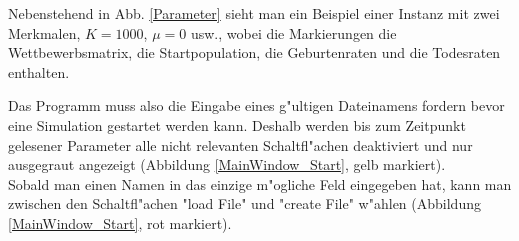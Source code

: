 \documentclass[11pt, a4paper, german]{article}
\theoremstyle{plain}
\begin{document}
\begin{center}
\begin{minipage}{0.6\textwidth}
		Nebenstehend in Abb. \ref{Parameter} sieht man ein Beispiel einer Instanz mit zwei Merkmalen, $ K = 1000 $, $ \mu = 0 $ usw., wobei die Markierungen die Wettbewerbsmatrix, die Startpopulation, die Geburtenraten und die Todesraten enthalten.\\
	\end{minipage}
	\end{center}
	
	Das Programm muss also die Eingabe eines g"ultigen Dateinamens fordern bevor eine Simulation gestartet werden kann. Deshalb werden bis zum Zeitpunkt gelesener Parameter alle nicht relevanten Schaltfl"achen deaktiviert und nur ausgegraut angezeigt (Abbildung \ref{MainWindow_Start}, gelb markiert).\\
	Sobald man einen Namen in das einzige m"ogliche Feld eingegeben hat, kann man zwischen den Schaltfl"achen "{}load File"{} und "{}create File"{} w"ahlen (Abbildung \ref{MainWindow_Start}, rot markiert).\\
	
\end{document}
